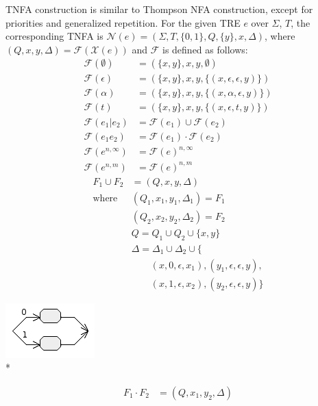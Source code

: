 \documentclass{article}
\newenvironment{Xfig}
    {\par\medskip\noindent\minipage{\linewidth}\begin{center}}
    {\end{center}\endminipage\par\medskip}
\newcommand{\Xeq}{\!=\!}
\newcommand{\XF}{\mathcal{F}}
\newcommand{\XN}{\mathcal{N}}
\newcommand{\XX}{\mathcal{X}}
\theoremstyle{definition}
\begin{document}
\begin{multicols}{2}
TNFA construction is similar to Thompson NFA construction,
except for priorities and generalized repetition.
For the given TRE $e$ over $\Sigma$, $T$, the corresponding TNFA is $\XN(e) \Xeq (\Sigma, T, \{0, 1\}, Q, \{ y \}, x, \Delta)$,
where $(Q, x, y, \Delta) \Xeq \XF(\XX(e))$ and $\XF$ is defined as follows:
    \begin{align*}
        \XF(\emptyset) &= (\{ x, y \}, x, y, \emptyset) \\
        \XF(\epsilon) &= (\{ x, y \}, x, y, \{ (x, \epsilon, \epsilon, y) \}) \\
        \XF(\alpha) &= (\{ x, y \}, x, y, \{ (x, \alpha, \epsilon, y) \}) \\
        \XF(t) &= (\{ x, y \}, x, y, \{ (x, \epsilon, t, y) \}) \\
        \XF(e_1 | e_2) &= \XF(e_1) \cup \XF(e_2) \\
        \XF(e_1 e_2) &= \XF(e_1) \cdot \XF(e_2) \\
        \XF(e^{n,\infty}) &= \XF(e)^{n,\infty} \\
        \XF(e^{n,m}) &= \XF(e)^{n, m}
    \end{align*}
%
    \begin{align*}
        F_1 \cup F_2 &= (Q, x, y, \Delta) \\
        \text{where }
            & (Q_1, x_1, y_1, \Delta_1) = F_1 \\
            & (Q_2, x_2, y_2, \Delta_2) = F_2 \\
            & Q = Q_1 \cup Q_2 \cup \{ x, y \} \\
            & \Delta = \Delta_1 \cup \Delta_2 \cup \{ \\
                & \qquad (x, 0, \epsilon, x_1), (y_1, \epsilon, \epsilon, y), \\
                & \qquad (x, 1, \epsilon, x_2), (y_2, \epsilon, \epsilon, y) \}
    \end{align*}
%
\begin{Xfig}
\includegraphics[width=0.3\linewidth]{img/tnfa_union.png}\\*
\end{Xfig}
%
    \begin{align*}
        F_1 \cdot F_2 &= (Q, x_1, y_2, \Delta) \\

\end{align*}
\end{multicols}
\end{document}
